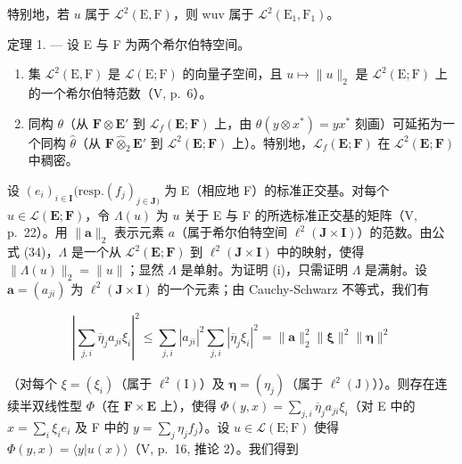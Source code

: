 特别地，若 \(u\) 属于 \(\mathcal{L}^2(\mathrm{E},\mathrm{F})\)，则 wuv 属于 \(\mathcal{L}^2(\mathrm{E}_1,\mathrm{F}_1)\)。

定理 1. --- 设 E 与 F 为两个希尔伯特空间。

\begin{enumerate}
\def\labelenumi{(\roman{enumi})}
\item
  集 \(\mathcal{L}^2 (\mathrm{E},\mathrm{F})\) 是 \(\mathcal{L}(\mathrm{E};\mathrm{F})\) 的向量子空间，且 \(u\mapsto \| u\| _2\) 是 \(\mathcal{L}^2 (\mathrm{E};\mathrm{F})\) 上的一个希尔伯特范数（V, p.~6）。
\item
  同构 \(\theta\)（从 \(\mathbf{F} \otimes \mathbf{E}'\) 到 \(\mathcal{L}_f(\mathbf{E};\mathbf{F})\) 上，由 \(\theta(y \otimes x^*) = yx^*\) 刻画）可延拓为一个同构 \(\hat{\theta}\)（从 \(\mathbf{F} \hat{\otimes}_2 \mathbf{E}'\) 到 \(\mathcal{L}^2(\mathbf{E};\mathbf{F})\) 上）。特别地，\(\mathcal{L}_f(\mathbf{E};\mathbf{F})\) 在 \(\mathcal{L}^2(\mathbf{E};\mathbf{F})\) 中稠密。
\end{enumerate}

设 \((e_i)_{i\in \mathbf{I}}(\mathrm{resp.}(f_j)_{j\in \mathbf{J})}\) 为 E（相应地 F）的标准正交基。对每个 \(u\in \mathcal{L}(\mathbf{E};\mathbf{F})\)，令 \(\Lambda (u)\) 为 \(u\) 关于 E 与 F 的所选标准正交基的矩阵（V, p.~22）。用 \(\| \mathbf{a}\| _2\) 表示元素 \(a\)（属于希尔伯特空间 \(\ell^2 (\mathbf{J}\times \mathbf{I})\)）的范数。由公式 (34)，\(\Lambda\) 是一个从 \(\mathcal{L}^2 (\mathbf{E};\mathbf{F})\) 到 \(\ell^2 (\mathbf{J}\times \mathbf{I})\) 中的映射，使得 \(\| \Lambda (u)\| _2 = \| u\|\)；显然 \(\Lambda\) 是单射。为证明 (i)，只需证明 \(\Lambda\) 是满射。设 \(\mathbf{a} = (a_{ji})\) 为 \(\ell^2 (\mathbf{J}\times \mathbf{I})\) 的一个元素；由 Cauchy-Schwarz 不等式，我们有

\[
\left| \sum_ {j, i} \overline {{{{\eta}}}} _ {j} a _ {j i} \xi_ {i} \right| ^ {2} \leqslant \sum_ {j, i} | a _ {j i} | ^ {2} \sum_ {j, i} | \overline {{{{\eta}}}} _ {j} \xi_ {i} | ^ {2} = \| \mathbf {a} \| _ {2} ^ {2} \| \boldsymbol {\xi} \| ^ {2} \| \boldsymbol {\eta} \| ^ {2}
\]

（对每个 \(\xi = (\xi_i)\)（属于 \(\ell^2 (\mathrm{I})\)）及 \(\pmb{\eta} = (\eta_j)\)（属于 \(\ell^2 (\mathrm{J})\)））。则存在连续半双线性型 \(\Phi\)（在 \(\mathbf{F}\times \mathbf{E}\) 上），使得 \(\Phi (y,x) = \sum_{j,i}\overline{\eta}_ja_{ji}\xi_i\)（对 E 中的 \(x = \sum_{i}\xi_{i}e_{i}\) 及 F 中的 \(y = \sum_{j}\eta_{j}f_{j}\)）。设 \(u\in \mathcal{L}(\mathrm{E};\mathrm{F})\) 使得 \(\Phi (y,x) = \langle y|u(x)\rangle\)（V, p.~16, 推论 2）。我们得到

